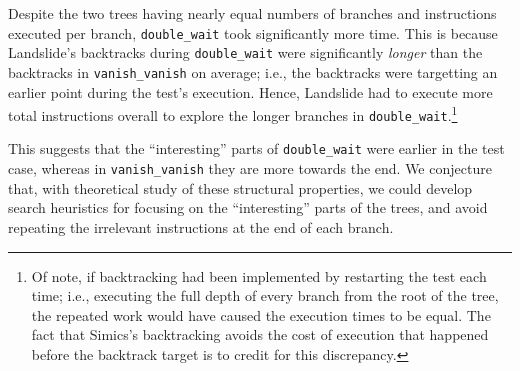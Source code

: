 Despite the two trees having nearly equal numbers of branches and instructions executed per branch, \texttt{double\_wait} took significantly more time. This is because Landslide's backtracks during \texttt{double\_wait} were significantly {\em longer} than the backtracks in \texttt{vanish\_vanish} on average; i.e., the backtracks were targetting an earlier point during the test's execution.
Hence, Landslide had to execute more total instructions overall to explore the longer branches in \texttt{double\_wait}.\footnote{
Of note, if backtracking had been implemented by restarting the test each time; i.e., executing the full depth of every branch from the root of the tree, the repeated work would have caused the execution times to be equal. The fact that Simics's backtracking avoids the cost of execution that happened before the backtrack target is to credit for this discrepancy.}

This suggests that the ``interesting'' parts of \texttt{double\_wait} were earlier in the test case, whereas in \texttt{vanish\_vanish} they are more towards the end. We conjecture that, with theoretical study of these structural properties, we could develop search heuristics for focusing on the ``interesting'' parts of the trees, and avoid repeating the irrelevant instructions at the end of each branch.
